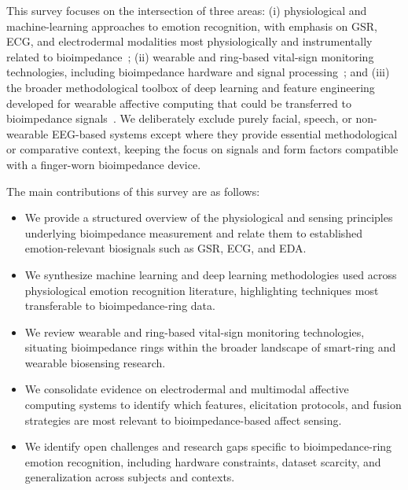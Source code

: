 This survey focuses on the intersection of three areas: (i) physiological and machine-learning approaches to emotion recognition, with emphasis on GSR, ECG, and electrodermal modalities most physiologically and instrumentally related to bioimpedance~\cite{ayata2017emotion,bulagang2020review,damelio2023exploring}; (ii) wearable and ring-based vital-sign monitoring technologies, including bioimpedance hardware and signal processing~\cite{lindstrom2025wearable,sel2023continuous,sanai2021evaluation,jacobs2026advancing}; and (iii) the broader methodological toolbox of deep learning and feature engineering developed for wearable affective computing that could be transferred to bioimpedance signals~\cite{dissanayake2022sigrep,filippini2022automated,zou2024emotion}. We deliberately exclude purely facial, speech, or non-wearable EEG-based systems except where they provide essential methodological or comparative context, keeping the focus on signals and form factors compatible with a finger-worn bioimpedance device.

The main contributions of this survey are as follows:

\begin{itemize}
\item We provide a structured overview of the physiological and sensing principles underlying bioimpedance measurement and relate them to established emotion-relevant biosignals such as GSR, ECG, and EDA.
\item We synthesize machine learning and deep learning methodologies used across physiological emotion recognition literature, highlighting techniques most transferable to bioimpedance-ring data.
\item We review wearable and ring-based vital-sign monitoring technologies, situating bioimpedance rings within the broader landscape of smart-ring and wearable biosensing research.
\item We consolidate evidence on electrodermal and multimodal affective computing systems to identify which features, elicitation protocols, and fusion strategies are most relevant to bioimpedance-based affect sensing.
\item We identify open challenges and research gaps specific to bioimpedance-ring emotion recognition, including hardware constraints, dataset scarcity, and generalization across subjects and contexts.
\end{itemize}

